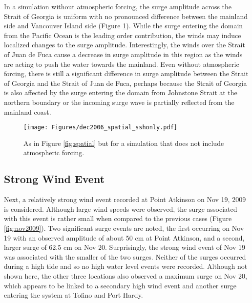 \documentclass{tATO2e}
\begin{document}
In a simulation without atmospheric forcing, the surge amplitude across the Strait of Georgia is uniform with no pronounced difference between the mainland side and Vancouver Island side (Figure \ref{fig:spatial_sshonly}). While the surge entering the domain from the Pacific Ocean is the leading order contribution, the winds may induce localized changes to the surge amplitude. Interestingly, the winds over the Strait of Juan de Fuca cause a decrease in surge amplitude in this region as the winds are acting to push the water towards the mainland.  Even without atmospheric forcing, there is still a significant difference in surge amplitude between the Strait of Georgia and the Strait of Juan de Fuca, perhaps because the Strait of Georgia is also affected by the surge entering the domain from Johnstone Strait at the northern boundary or the incoming surge wave is partially reflected from the mainland coast. 

\begin{figure}
\centering
\texttt{[image: Figures/dec2006\_spatial\_sshonly.pdf]}
\caption{As in Figure \ref{fig:spatial} but for a simulation that does not include atmospheric forcing. }
\label{fig:spatial_sshonly}
\end{figure}

\subsection{Strong Wind Event}\label{sec:wind}
Next, a relatively strong wind event recorded at Point Atkinson on Nov 19, 2009 is considered. Although large wind speeds were observed, the surge associated with this event is rather small when compared to the previous cases (Figure \ref{fig:nov2009}). Two significant surge events are noted, the first occurring on Nov 19 with an observed amplitude of about 50 cm at Point Atkinson, and a second, larger surge of 62.5 cm on Nov 20. Surprisingly, the strong wind event of Nov 19 was associated with the smaller of the two surges. Neither of the surges occurred during a high tide and so no high water level events were recorded. Although not shown here, the other three locations also observed a maximum surge on Nov 20, which appears to be linked to a secondary high wind event and another surge entering the system at Tofino and Port Hardy. 
\end{document}
